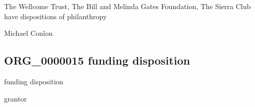 \documentclass[letterpaper,10pt,english]{sphinxmanual}
\begin{document}
\begin{sphinxShadowBox}

\sphinxAtStartPar
{}
\end{sphinxShadowBox}

\begin{sphinxShadowBox}

\sphinxAtStartPar
The Wellcome Trust, The Bill and Melinda Gates Foundation, The Sierra Club have dispositions of philanthropy
\end{sphinxShadowBox}

\begin{sphinxShadowBox}

\sphinxAtStartPar
Michael Conlon 
\end{sphinxShadowBox}
\begin{quote}

\ignorespaces \end{quote}


\subsection{ORG\_0000015 \sphinxhyphen{} funding disposition}
\label{\detokenize{doc-ORG_0000015:org-0000015-funding-disposition}}\label{\detokenize{doc-ORG_0000015:index-0}}\label{\detokenize{doc-ORG_0000015::doc}}
\begin{sphinxShadowBox}

\sphinxAtStartPar
funding disposition
\end{sphinxShadowBox}

\begin{sphinxShadowBox}

\sphinxAtStartPar
grantor
\end{sphinxShadowBox}

\begin{sphinxShadowBox}

\sphinxAtStartPar
{\hyperref[\detokenize{doc-BFO_0000016::doc}]{}}
\end{sphinxShadowBox}
\end{document}
